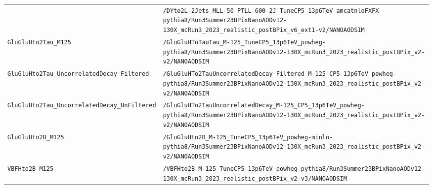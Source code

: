 \begin{longtable}{@{}>{\RaggedRight\arraybackslash}p{} >{\RaggedRight\arraybackslash}p{}@{}}
 & \texttt{/\allowbreak{}DYto2L-\allowbreak{}2Jets\_\allowbreak{}MLL-\allowbreak{}50\_\allowbreak{}PTLL-\allowbreak{}600\_\allowbreak{}2J\_\allowbreak{}TuneCP5\_\allowbreak{}13p6TeV\_\allowbreak{}amcatnloFXFX-\allowbreak{}pythia8/\allowbreak{}Run3Summer23BPixNanoAODv12-\allowbreak{}130X\_\allowbreak{}mcRun3\_\allowbreak{}2023\_\allowbreak{}realistic\_\allowbreak{}postBPix\_\allowbreak{}v6\_\allowbreak{}ext1-\allowbreak{}v2/\allowbreak{}NANOAODSIM} \\
\addlinespace[2pt]
\texttt{GluGluHto2Tau\_\allowbreak{}M125} & \texttt{/\allowbreak{}GluGluHToTauTau\_\allowbreak{}M-\allowbreak{}125\_\allowbreak{}TuneCP5\_\allowbreak{}13p6TeV\_\allowbreak{}powheg-\allowbreak{}pythia8/\allowbreak{}Run3Summer23BPixNanoAODv12-\allowbreak{}130X\_\allowbreak{}mcRun3\_\allowbreak{}2023\_\allowbreak{}realistic\_\allowbreak{}postBPix\_\allowbreak{}v2-\allowbreak{}v2/\allowbreak{}NANOAODSIM} \\
\addlinespace[2pt]
\texttt{GluGluHto2Tau\_\allowbreak{}UncorrelatedDecay\_\allowbreak{}Filtered} & \texttt{/\allowbreak{}GluGluHTo2TauUncorrelatedDecay\_\allowbreak{}Filtered\_\allowbreak{}M-\allowbreak{}125\_\allowbreak{}CP5\_\allowbreak{}13p6TeV\_\allowbreak{}powheg-\allowbreak{}pythia8/\allowbreak{}Run3Summer23BPixNanoAODv12-\allowbreak{}130X\_\allowbreak{}mcRun3\_\allowbreak{}2023\_\allowbreak{}realistic\_\allowbreak{}postBPix\_\allowbreak{}v2-\allowbreak{}v2/\allowbreak{}NANOAODSIM} \\
\addlinespace[2pt]
\texttt{GluGluHto2Tau\_\allowbreak{}UncorrelatedDecay\_\allowbreak{}UnFiltered} & \texttt{/\allowbreak{}GluGluHTo2TauUncorrelatedDecay\_\allowbreak{}M-\allowbreak{}125\_\allowbreak{}CP5\_\allowbreak{}13p6TeV\_\allowbreak{}powheg-\allowbreak{}pythia8/\allowbreak{}Run3Summer23BPixNanoAODv12-\allowbreak{}130X\_\allowbreak{}mcRun3\_\allowbreak{}2023\_\allowbreak{}realistic\_\allowbreak{}postBPix\_\allowbreak{}v2-\allowbreak{}v2/\allowbreak{}NANOAODSIM} \\
\addlinespace[2pt]
\texttt{GluGluHto2B\_\allowbreak{}M125} & \texttt{/\allowbreak{}GluGluHto2B\_\allowbreak{}M-\allowbreak{}125\_\allowbreak{}TuneCP5\_\allowbreak{}13p6TeV\_\allowbreak{}powheg-\allowbreak{}minlo-\allowbreak{}pythia8/\allowbreak{}Run3Summer23BPixNanoAODv12-\allowbreak{}130X\_\allowbreak{}mcRun3\_\allowbreak{}2023\_\allowbreak{}realistic\_\allowbreak{}postBPix\_\allowbreak{}v2-\allowbreak{}v2/\allowbreak{}NANOAODSIM} \\
\addlinespace[2pt]
\texttt{VBFHto2B\_\allowbreak{}M125} & \texttt{/\allowbreak{}VBFHto2B\_\allowbreak{}M-\allowbreak{}125\_\allowbreak{}TuneCP5\_\allowbreak{}13p6TeV\_\allowbreak{}powheg-\allowbreak{}pythia8/\allowbreak{}Run3Summer23BPixNanoAODv12-\allowbreak{}130X\_\allowbreak{}mcRun3\_\allowbreak{}2023\_\allowbreak{}realistic\_\allowbreak{}postBPix\_\allowbreak{}v2-\allowbreak{}v3/\allowbreak{}NANOAODSIM} \\

\end{longtable}
